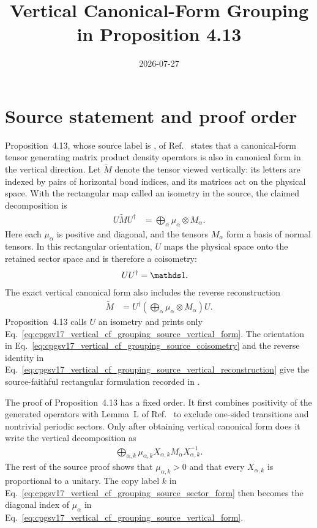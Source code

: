 \documentclass{article}
\title{Vertical Canonical-Form Grouping in Proposition 4.13}
\author{}
\date{2026-07-27}
\begin{document}
\maketitle
{}

\section{Source statement and proof order}

Proposition~4.13, whose source label is , of
Ref.~\cite{Cirac2016MPDO_arXiv} states that a canonical-form tensor generating
matrix product density operators is also in canonical form in the vertical
direction. Let $\widetilde M$ denote the tensor viewed vertically: its letters
are indexed by pairs of horizontal bond indices, and its matrices act on the
physical space. With the rectangular map called an isometry in the source, the
claimed decomposition is
\begin{align}
    U\widetilde M U^\dagger
     & =\bigoplus_\alpha\mu_\alpha\otimes M_\alpha.
    \label{eq:cpgsv17_vertical_cf_grouping_source_vertical_form}
\end{align}
Here each $\mu_\alpha$ is positive and diagonal, and the tensors $M_\alpha$
form a basis of normal tensors. In this rectangular orientation, $U$ maps the
physical space onto the retained sector space and is therefore a coisometry:
\begin{align}
    UU^\dagger
     & =\Id.
    \label{eq:cpgsv17_vertical_cf_grouping_source_coisometry}
\end{align}
The exact vertical canonical form also includes the reverse reconstruction
\begin{align}
    \widetilde M
     & =U^\dagger
    \left(\bigoplus_\alpha\mu_\alpha\otimes M_\alpha\right)U.
    \label{eq:cpgsv17_vertical_cf_grouping_source_vertical_reconstruction}
\end{align}
Proposition~4.13 calls $U$ an isometry and prints only
Eq.~\ref{eq:cpgsv17_vertical_cf_grouping_source_vertical_form}. The
orientation in
Eq.~\ref{eq:cpgsv17_vertical_cf_grouping_source_coisometry} and the reverse
identity in
Eq.~\ref{eq:cpgsv17_vertical_cf_grouping_source_vertical_reconstruction} give
the source-faithful rectangular formulation recorded in
.

The proof of Proposition~4.13 has a fixed order. It first combines positivity
of the generated operators with Lemma~L of
Ref.~\cite{Cirac2016MPDO_arXiv} to exclude one-sided transitions and
nontrivial periodic sectors. Only after obtaining vertical canonical form does
it write the vertical decomposition as
\begin{align}
    \bigoplus_{\alpha,k}
    \mu_{\alpha,k}X_{\alpha,k}M_\alpha X_{\alpha,k}^{-1}.
    \label{eq:cpgsv17_vertical_cf_grouping_source_sector_form}
\end{align}
The rest of the source proof shows that $\mu_{\alpha,k}>0$ and that every
$X_{\alpha,k}$ is proportional to a unitary. The copy label $k$ in
Eq.~\ref{eq:cpgsv17_vertical_cf_grouping_source_sector_form} then becomes the
diagonal index of $\mu_\alpha$ in
Eq.~\ref{eq:cpgsv17_vertical_cf_grouping_source_vertical_form}.
\end{document}

